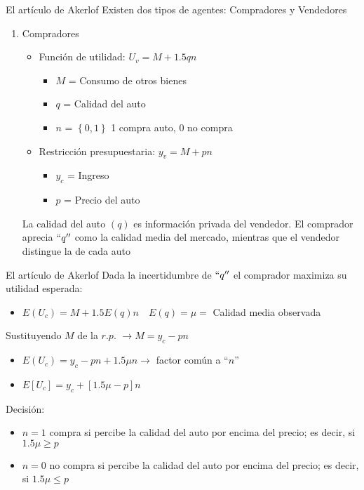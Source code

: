 \begin{frame}{El artículo de Akerlof}
	Existen dos tipos de agentes: Compradores y Vendedores
		\begin{enumerate}
			\item Compradores
				\begin{itemize}
					\item Función de utilidad: $U_v = M +1.5qn$
						\begin{itemize}
							\item $M$ = Consumo de otros bienes
							\item $q$ = Calidad del auto
							\item $n$ = $\left\lbrace 0,1\right\rbrace $ 1 compra auto, 0 no compra
						\end{itemize}
					\item Restricción presupuestaria: $y_v = M + pn$
						\begin{itemize}
							\item $y_c$ = Ingreso
							\item $p$ = Precio del auto
						\end{itemize}
				\end{itemize}
			La calidad del auto $(q)$ es información privada del vendedor. El comprador aprecia $``q''$ como la calidad media del mercado, mientras que el vendedor distingue la de cada auto
		\end{enumerate}
\end{frame}
\begin{frame}{El artículo de Akerlof}
	Dada la incertidumbre de $``q''$ el comprador maximiza su utilidad esperada:
		\begin{itemize}
			\item $E(U_c)=M+1.5E(q)n \quad E(q) = \mu =$ Calidad media observada
		\end{itemize}
	Sustituyendo $M$ de la $r.p .$ $\longrightarrow M =y_c - pn$ 
		\begin{itemize}
			\item $E(U_c) = y_c - pn + 1.5\mu n \longrightarrow $  factor común a ``$n$''
			\item $E[U_c] = y_c +\left[ 1.5\mu - p\right]n$
		\end{itemize}
	Decisión:
		\begin{itemize}
			\item $n=1$ compra si percibe la calidad del auto por encima del precio; es decir, si $1.5\mu \geq p$
			\item $n=0$ no compra si percibe la calidad del auto por encima del precio; es decir, si $1.5\mu \leq p$
		\end{itemize}
\end{frame}
